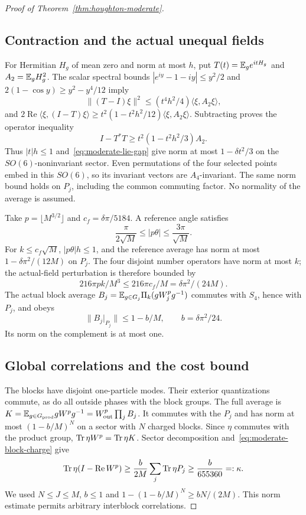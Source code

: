 \begin{proof}[Proof of Theorem~\ref{thm:houghton-moderate}]
\subsection{Contraction and the actual unequal fields}

For Hermitian $H_g$ of mean zero and norm at most $h$, put
$T(t)=\mathbb E_ge^{itH_g}$ and $A_2=\mathbb E_gH_g^2$.
The scalar spectral bounds
$|e^{iy}-1-iy|\leq y^2/2$ and
$2(1-\cos y)\geq y^2-y^4/12$ imply
\[
 \|(T-I)\xi\|^2\leq(t^4h^2/4)\langle\xi,A_2\xi\rangle,
\]
and
$2\operatorname{Re}\langle\xi,(I-T)\xi\rangle
\geq t^2(1-t^2h^2/12)\langle\xi,A_2\xi\rangle$.
Subtracting proves the operator inequality
\begin{equation}\label{eq:moderate-contraction}
 I-T^*T\geq t^2(1-t^2h^2/3)A_2.
\end{equation}
Thus $|t|h\leq1$ and~\eqref{eq:moderate-lie-gap} give norm
at most $1-\delta t^2/3$ on the $SO(6)$-noninvariant sector.
Even permutations of the four selected points embed in this $SO(6)$,
so its invariant vectors are $A_4$-invariant.
The same norm bound holds on $P_j$, including the common commuting factor.
No normality of the average is assumed.

Take $p=\lfloor M^{3/2}\rfloor$ and
$c_f=\delta\pi/5184$. A reference angle satisfies
\[
 \frac\pi{2\sqrt M}\leq|p\theta|\leq\frac{3\pi}{\sqrt M}.
\]
For $k\leq c_f\sqrt M$, $|p\theta|h\leq1$, and the reference
average has norm at most $1-\delta\pi^2/(12M)$ on $P_j$.
The four disjoint number operators have norm at most $k$;
the actual-field perturbation is therefore bounded by
\[
 216\pi pk/M^3\leq216\pi c_f/M=\delta\pi^2/(24M).
\]
The actual block average
$B_j=\mathbb E_{g\in G_j}\Pi_k(gW_j^pg^{-1})$
commutes with $S_4$, hence with $P_j$, and obeys
\begin{equation}\label{eq:moderate-block-norm}
 \|B_j|_{P_j}\|\leq1-b/M,\qquad b=\delta\pi^2/24.
\end{equation}
Its norm on the complement is at most one.

\subsection{Global correlations and the cost bound}

The blocks have disjoint one-particle modes. Their exterior
quantizations commute, as do all outside phases with the block groups.
The full average is
$K=\mathbb E_{g\in G_{\rm prod}}gW^pg^{-1}=W_{\rm out}^p\prod_jB_j$.
It commutes with the $P_j$ and has norm at most $(1-b/M)^N$
on a sector with $N$ charged blocks.
Since $\eta$ commutes with the product group,
$\operatorname{Tr}\eta W^p=\operatorname{Tr}\eta K$.
Sector decomposition and~\eqref{eq:moderate-block-charge} give
\[
 \operatorname{Tr}\eta(I-\operatorname{Re}W^p)
 \geq\frac b{2M}\sum_j\operatorname{Tr}\eta P_j
 \geq\frac b{655360}=:\kappa.
\]
We used $N\leq J\leq M$, $b\leq1$ and
$1-(1-b/M)^N\geq bN/(2M)$.
This norm estimate permits arbitrary interblock correlations.


\end{proof}
